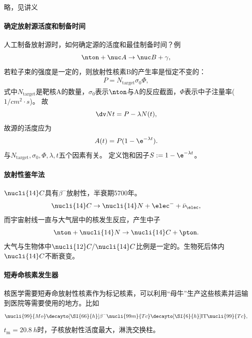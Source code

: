 略，见讲义

\paragraph{确定放射源活度和制备时间}

人工制备放射源时，如何确定源的活度和最佳制备时间？例
\[
	\nton+\nuc A\to\nuc B+\gamma,
\]
若粒子束的强度是一定的，则放射性核素B的产生率是恒定不变的：
\begin{align}
	P=N_{\mathrm{target}}\sigma_0\Phi,
\end{align}
式中$N_{\mathrm{target}}$是靶核A的数量，$\sigma_0$表示$\nton$与A的反应截面，$\Phi$表示中子注量率($\si{1/cm^2\cdot s}$)。
故
\[
	\dv Nt=P-\lambda N(t),
\]
故源的活度应为
\begin{align}
	A(t)=P(1-\e^{-\lambda t}).
\end{align}
与$N_{\mathrm{target}},\sigma_0,\Phi,\lambda,t$五个因素有关。
定义饱和因子$S:=1-\e^{-\lambda t}$。

\paragraph{放射性鉴年法}

$\nucli{14}C$具有$\beta^-$放射性，半衰期5700年。
\[
	\nucli{14}C\to\nucli{14}N+\elec^-+\bar\nu_\elec,
\]
而宇宙射线一直与大气层中的核发生反应，产生中子
\[
	\nton+\nucli{14}N\to\nucli{14}C+\pton.
\]
大气与生物体中$\nucli{12}C/\nucli{14}C$比例是一定的。生物死后体内$\nucli{14}C$不断衰变。
\paragraph{短寿命核素发生器}

核医学需要短寿命放射性核素作为标记核素，可以利用“母牛”生产这些核素并运输到医院等需要使用的地方。比如
\[
	\nucli{99}{Mo}\decayto[\SI{66}{h}]{\beta^-}\nucli{99m}{Tc}\decayto[\SI{6}{h}]{\mathrm{IT}}\nucli{99}{Tc},
\]
$t_\mathrm m=\SI{20.8}{h}$时，子核放射性活度最大，淋洗交换柱。

